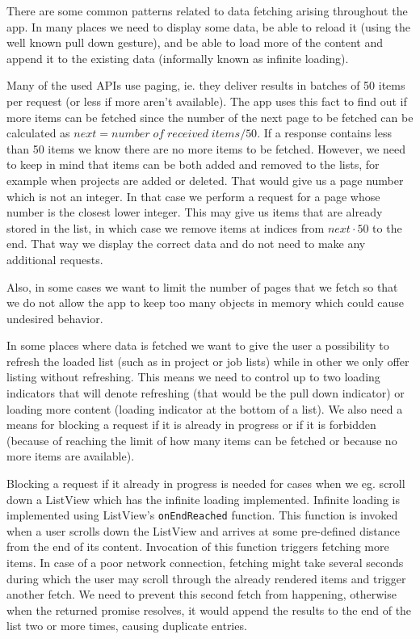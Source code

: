 There are some common patterns related to data fetching arising throughout the app. In many places we need to display some data, be able to reload it (using the well known pull down gesture), and be able to load more of the content and append it to the existing data (informally known as infinite loading).

Many of the used APIs use paging, ie. they deliver results in batches of 50 items per request (or less if more aren't available). The app uses this fact to find out if more items can be fetched since the number of the next page to be fetched can be calculated as $next = number \;of\; received \;items / 50$. If a response contains less than 50 items we know there are no more items to be fetched. However, we need to keep in mind that items can be both added and removed to the lists, for example when projects are added or deleted. That would give us a page number which is not an integer. In that case we perform a request for a page whose number is the closest lower integer. This may give us items that are already stored in the list, in which case we remove items at indices from $next \cdot 50$ to the end. That way we display the correct data and do not need to make any additional requests.

Also, in some cases we want to limit the number of pages that we fetch so that we do not allow the app to keep too many objects in memory which could cause undesired behavior. 

In some places where data is fetched we want to give the user a possibility to refresh the loaded list (such as in project or job lists) while in other we only offer listing without refreshing. This means we need to control up to two loading indicators that will denote refreshing (that would be the pull down indicator) or loading more content (loading indicator at the bottom of a list). We also need a means for blocking a request if it is already in progress or if it is forbidden (because of reaching the limit of how many items can be fetched or because no more items are available). 

Blocking a request if it already in progress is needed for cases when we eg. scroll down a ListView which has the infinite loading implemented. Infinite loading is implemented using ListView’s \texttt{onEndReached} function. This function is invoked when a user scrolls down the ListView and arrives at some pre-defined distance from the end of its content. Invocation of this function triggers fetching more items. In case of a poor network connection, fetching might take several seconds during which the user may scroll through the already rendered items and trigger another fetch. We need to prevent this second fetch from happening, otherwise when the returned promise resolves, it would append the results to the end of the list two or more times, causing duplicate entries.
 
